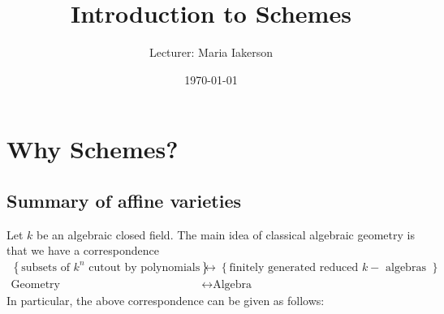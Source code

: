 \documentclass[12pt]{article} %
\title{Introduction to Schemes} %
\author{Lecturer: Maria Iakerson} %
\date{\today} %
\begin{document}
\maketitle %
\tableofcontents
\section{Why Schemes?}
\subsection{Summary of affine varieties}
Let $k$ be an algebraic closed field. The main idea of classical algebraic geometry is that we
have a correspondence
\begin{align*}
      \left\lbrace\text{subsets of $k^n$ cut} \text{out by polynomials} \right\rbrace & \leftrightarrow
      \left\lbrace \text{finitely generated reduced
      $k-$ algebras }\right\rbrace                                                                                     \\
      \text{Geometry}                                                                 & \leftrightarrow \text{Algebra}
\end{align*}
In particular, the above correspondence can be given as follows:
\end{document}

